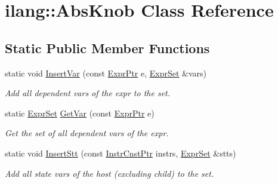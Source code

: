 \hypertarget{classilang_1_1_abs_knob}{}\section{ilang\+:\+:Abs\+Knob Class Reference}
\label{classilang_1_1_abs_knob}
\subsection*{Static Public Member Functions}
\begin{DoxyCompactItemize}
\item 
\mbox{\label{classilang_1_1_abs_knob_a5a33dbfc4404e0d07cbfc4f1ca03f8f4}} 
static void \mbox{\hyperlink{classilang_1_1_abs_knob_a5a33dbfc4404e0d07cbfc4f1ca03f8f4}{Insert\+Var}} (const \mbox{\hyperlink{namespaceilang_a7c4196c72e53ea4df4b7861af7bc3bce}{Expr\+Ptr}} e, \mbox{\hyperlink{namespaceilang_a54732171848dbcb975458e689024a04c}{Expr\+Set}} \&vars)
\begin{DoxyCompactList}\small\item\em Add all dependent vars of the expr to the set. \end{DoxyCompactList}\item 
\mbox{\label{classilang_1_1_abs_knob_a8cbfc77a2e55b92c6b290ed116d79a54}} 
static \mbox{\hyperlink{namespaceilang_a54732171848dbcb975458e689024a04c}{Expr\+Set}} \mbox{\hyperlink{classilang_1_1_abs_knob_a8cbfc77a2e55b92c6b290ed116d79a54}{Get\+Var}} (const \mbox{\hyperlink{namespaceilang_a7c4196c72e53ea4df4b7861af7bc3bce}{Expr\+Ptr}} e)
\begin{DoxyCompactList}\small\item\em Get the set of all dependent vars of the expr. \end{DoxyCompactList}\item 
\mbox{\label{classilang_1_1_abs_knob_adb0859993dab8f5ca800c62e7c78b178}} 
static void \mbox{\hyperlink{classilang_1_1_abs_knob_adb0859993dab8f5ca800c62e7c78b178}{Insert\+Stt}} (const \mbox{\hyperlink{namespaceilang_a13249a9b1d22eb3454730a7903be4364}{Instr\+Cnst\+Ptr}} instrs, \mbox{\hyperlink{namespaceilang_a54732171848dbcb975458e689024a04c}{Expr\+Set}} \&stts)
\begin{DoxyCompactList}\small\item\em Add all state vars of the host (excluding child) to the set. \end{DoxyCompactList}\item 

\end{DoxyCompactItemize}
